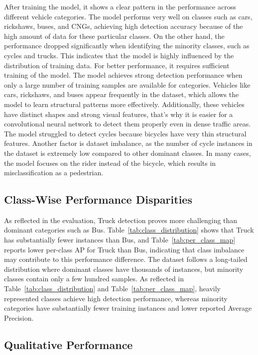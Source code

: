 \documentclass[sigconf]{acmart}
\begin{document}
After training the model, it shows a clear pattern in the performance across different vehicle categories. The model performs very well on classes such as cars, rickshaws, buses, and CNGs, achieving high detection accuracy because of the high amount of data for these particular classes. On the other hand, the performance dropped significantly when identifying the minority classes, such as cycles and trucks. This indicates that the model is highly influenced by the distribution of training data. For better performance, it requires sufficient training of the model. The model achieves strong detection performance when only a large number of training samples are available for categories. Vehicles like cars, rickshaws, and buses appear frequently in the dataset, which allows the model to learn structural patterns more effectively. Additionally, these vehicles have distinct shapes and strong visual features, that's why it is easier for a convolutional neural network to detect them properly even in dense traffic areas. The model struggled to detect cycles because bicycles have very thin structural features. Another factor is dataset imbalance, as the number of cycle instances in the dataset is extremely low compared to other dominant classes. In many cases, the model focuses on the rider instead of the bicycle, which results in misclassification as a pedestrian.

\subsection{Class-Wise Performance Disparities}
As reflected in the evaluation, Truck detection proves more challenging than dominant categories such as Bus. Table~\ref{tab:class_distribution} shows that Truck has substantially fewer instances than Bus, and Table~\ref{tab:per_class_map} reports lower per-class AP for Truck than Bus, indicating that class imbalance may contribute to this performance difference. The dataset follows a long-tailed distribution where dominant classes have thousands of instances, but minority classes contain only a few hundred samples. As reflected in Table~\ref{tab:class_distribution} and Table~\ref{tab:per_class_map}, heavily represented classes achieve high detection performance, whereas minority categories have substantially fewer training instances and lower reported Average Precision.

\subsection{Qualitative Performance}
\end{document}
